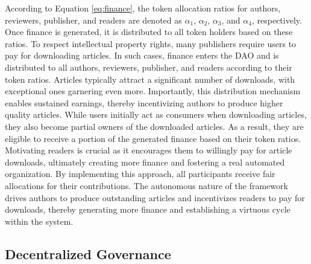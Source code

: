 \documentclass[lettersize,journal]{IEEEtran}
\begin{document}
According to Equation \ref{eq:finance}, the token allocation ratios for authors, reviewers, publisher, and readers are denoted as $\alpha_1$, $\alpha_2$, $\alpha_3$, and $\alpha_4$, respectively. Once finance is generated, it is distributed to all token holders based on these ratios. 
To respect intellectual property rights, many publishers require users to pay for downloading articles. In such cases, finance enters the DAO and is distributed to all authors, reviewers, publisher, and readers according to their token ratios. Articles typically attract a significant number of downloads, with exceptional ones garnering even more. Importantly, this distribution mechanism enables sustained earnings, thereby incentivizing authors to produce higher quality articles. 
While users initially act as consumers when downloading articles, they also become partial owners of the downloaded articles. As a result, they are eligible to receive a portion of the generated finance based on their token ratios. Motivating readers is crucial as it encourages them to willingly pay for article downloads, ultimately creating more finance and fostering a real automated organization. 
By implementing this approach, all participants receive fair allocations for their contributions. The autonomous nature of the framework drives authors to produce outstanding articles and incentivizes readers to pay for downloads, thereby generating more finance and establishing a virtuous cycle within the system.





\subsection{Decentralized Governance}
\end{document}
